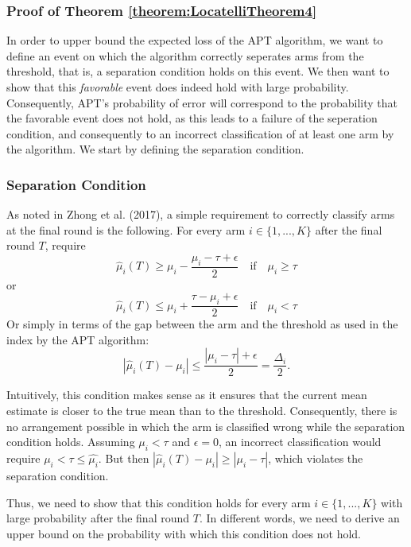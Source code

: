 \documentclass[11pt,]{article}
\begin{document}
\subsubsection{\texorpdfstring{Proof of Theorem
\ref{theorem:LocatelliTheorem4}
\label{sec:UpperBoundProof}}{Proof of Theorem  }}\label{proof-of-theorem}

In order to upper bound the expected loss of the APT algorithm, we want
to define an event on which the algorithm correctly seperates arms from
the threshold, that is, a separation condition holds on this event. We
then want to show that this \emph{favorable} event does indeed hold with
large probability. Consequently, APT's probability of error will
correspond to the probability that the favorable event does not hold, as
this leads to a failure of the seperation condition, and consequently to
an incorrect classification of at least one arm by the algorithm. We
start by defining the separation condition.

\subsubsection{Separation Condition}\label{separation-condition}

As noted in Zhong et al. (2017), a simple requirement to correctly
classify arms at the final round is the following. For every arm
\(i \in \{1, ..., K\}\) after the final round \(T\), require \[
\hat{\mu}_{i}(T) \geq \mu_i - \frac{\mu_i - \tau + \epsilon}{2} \quad \text{if} \quad \mu_i \geq \tau
\] or \[
\hat{\mu}_{i}(T) \leq \mu_i + \frac{\tau - \mu_i + \epsilon}{2} \quad \text{if} \quad \mu_i < \tau
\] Or simply in terms of the gap between the arm and the threshold as
used in the index by the APT algorithm: \[
| \hat{\mu}_{i}(T) - \mu_i | \leq \frac{|\mu_i - \tau| + \epsilon}{2} = \frac{\Delta_i}{2}.
\]

Intuitively, this condition makes sense as it ensures that the current
mean estimate is closer to the true mean than to the threshold.
Consequently, there is no arrangement possible in which the arm is
classified wrong while the separation condition holds. Assuming
\(\mu_i < \tau\) and \(\epsilon = 0\), an incorrect classification would
require \(\mu_i < \tau \leq \hat{\mu_i}\). But then
\(| \hat{\mu}_{i}(T) - \mu_i | \geq |\mu_i - \tau|\), which violates the
separation condition.

Thus, we need to show that this condition holds for every arm
\(i \in \{1,...,K\}\) with large probability after the final round
\(T\). In different words, we need to derive an upper bound on the
probability with which this condition does not hold.
\end{document}
